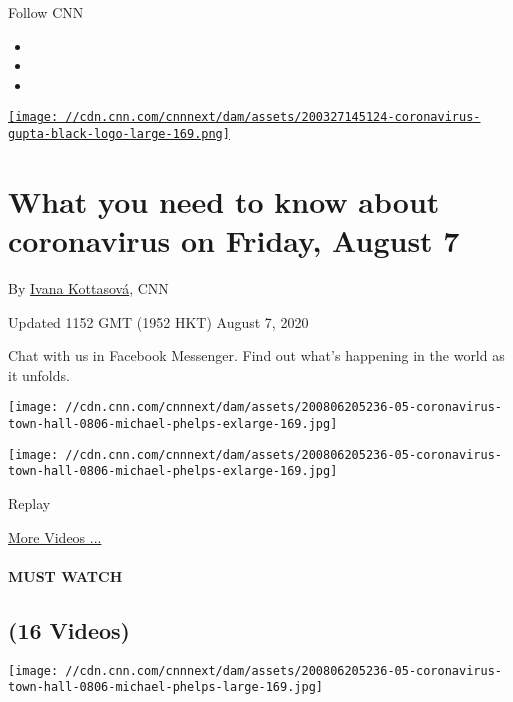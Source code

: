 Follow CNN

\begin{itemize}
\item
\item
\item
\end{itemize}

\href{/specials/coronavirus-newsletter}{\texttt{[image: //cdn.cnn.com/cnnnext/dam/assets/200327145124-coronavirus-gupta-black-logo-large-169.png]}}

\hypertarget{what-you-need-to-know-about-coronavirus-on-friday-august-7}{%
\section{What you need to know about coronavirus on Friday, August
7}\label{what-you-need-to-know-about-coronavirus-on-friday-august-7}}

By \href{/profiles/ivana-kottasova}{Ivana Kottasová}, CNN

Updated 1152 GMT (1952 HKT) August 7, 2020

Chat with us in Facebook Messenger. Find out what's happening in the
world as it unfolds.

\texttt{[image: //cdn.cnn.com/cnnnext/dam/assets/200806205236-05-coronavirus-town-hall-0806-michael-phelps-exlarge-169.jpg]}

\texttt{[image: //cdn.cnn.com/cnnnext/dam/assets/200806205236-05-coronavirus-town-hall-0806-michael-phelps-exlarge-169.jpg]}\href{javascript:void(0);}{}

Replay

\href{/videos}{More Videos ...}

\hypertarget{must-watch}{%
\paragraph{MUST WATCH}\label{must-watch}}

\hypertarget{16-videos}{%
\subsection{(16 Videos)}\label{16-videos}}

\href{/videos/health/2020/08/06/entire-august-6-coronavirus-town-hall-part-3-sot-vpx.cnn/video/playlists/coronavirus-intl/}{}

\texttt{[image: //cdn.cnn.com/cnnnext/dam/assets/200806205236-05-coronavirus-town-hall-0806-michael-phelps-large-169.jpg]}


